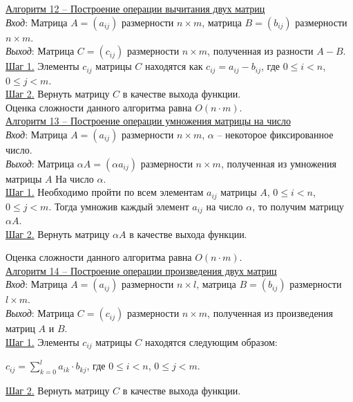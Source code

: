 \documentclass[bachelor, och, labwork]{shiza}
\begin{document}
        \underline{Алгоритм 12 -- Построение операции вычитания двух матриц}\\
            \textit{Вход}: Матрица $A = (a_{ij})$ размерности $n \times m$, матрица $B = (b_{ij})$ размерности $n \times m$.\\
            \textit{Выход}: Матрица $C = (c_{ij})$ размерности $n \times m$, полученная из разности $A - B$.\\
            \underline{Шаг 1.} Элементы $c_{ij}$ матрицы $C$ находятся как $c_{ij} = a_{ij} - b_{ij}$, где
            $0 \leq i < n$, $0 \leq j < m$. \\
            \underline{Шаг 2.} Вернуть матрицу $C$ в качестве выхода функции.\\
            
            Оценка сложности данного алгоритма равна $O(n \cdot m)$.\\

        \underline{Алгоритм 13 -- Построение операции умножения матрицы на число}\\
            \textit{Вход}: Матрица $A = (a_{ij})$ размерности $n \times m$, $\alpha$ -- некоторое фиксированное число.\\
            \textit{Выход}: Матрица $\alpha A = (\alpha a_{ij})$ размерности $n \times m$, полученная из умножения матрицы $A$ На
            число $\alpha$.\\
            \underline{Шаг 1.} Необходимо пройти по всем элементам $a_{ij}$ матрицы $A$, $0 \leq i < n$, $0 \leq j < m$. Тогда умножив каждый элемент $a_{ij}$ на число $\alpha$, то
            получим матрицу $\alpha A$.\\
            \underline{Шаг 2.} Вернуть матрицу $\alpha A$ в качестве выхода функции.
            
            Оценка сложности данного алгоритма равна $O(n \cdot m)$.\\


        \underline{Алгоритм 14 -- Построение операции произведения двух матриц}\\
            \textit{Вход}: Матрица $A = (a_{ij})$ размерности $n \times l$, матрица $B = (b_{ij})$ размерности $l \times m$.\\
            \textit{Выход}: Матрица $C = (c_{ij})$ размерности $n \times m$, полученная из произведения матриц $A$ и $B$.\\
            \underline{Шаг 1.} Элементы $c_{ij}$ матрицы $C$ находятся следующим образом:
             
            \begin{center}
                $c_{ij} = \sum_{k = 0}^{l} a_{ik} \cdot b_{kj}$, где $0 \leq i < n$, $0 \leq j < m$. \\
            \end{center}
            \underline{Шаг 2.} Вернуть матрицу $C$ в качестве выхода функции.\\
        
\end{document}
